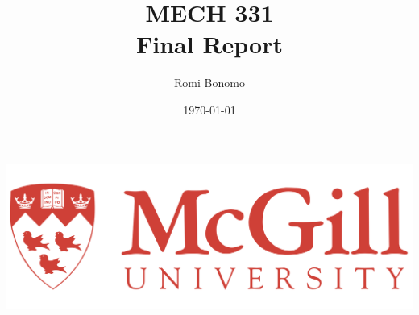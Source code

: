 \documentclass[12pt]{article}
\begin{document}
\title{MECH 331 \\ Final Report}
\author{Romi Bonomo}
\date{\today}
\maketitle
\includegraphics[scale=0.25]{Pictures/Mcgill_Logo.png}

\pagebreak


\end{document}
